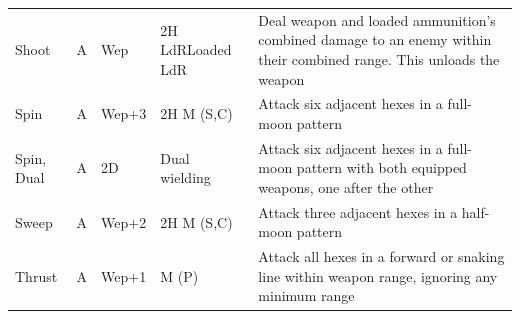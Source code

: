 \documentclass[12pt]{article}
\begin{document}
\begin{center}
\begin{tabularx}{\textwidth}{p{}p{}p{}p{}p{}}
Shoot & A & Wep & 2H LdR\newline Loaded LdR & Deal weapon and loaded ammunition’s combined damage to an enemy within their combined range. This unloads the weapon\\
Spin & A & Wep+3 & 2H M (S,C) & Attack six adjacent hexes in a full-moon pattern\\
Spin, Dual & A & 2D & Dual wielding & Attack six adjacent hexes in a full-moon pattern with both equipped weapons, one after the other\\
Sweep & A & Wep+2 & 2H M (S,C) & Attack three adjacent hexes in a half-moon pattern\\
Thrust & A & Wep+1 & M (P) & Attack all hexes in a forward or snaking line within weapon range, ignoring any minimum range\\
\hline
\end{tabularx}
\end{center}

\pagebreak
\end{document}
